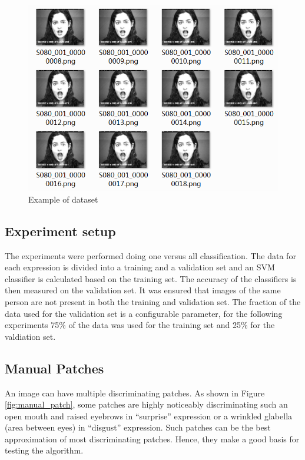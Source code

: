 \begin{figure}[h!]
\centering
\includegraphics[scale=0.55]{img/example.png}
\caption{Example of dataset}
\label{Example of dataset}
\end{figure}

\subsection{Experiment setup}
The experiments were performed doing one versus all classification. The data for each expression is divided into a training and a validation set and an SVM
classifier is calculated based on the training set. The accuracy of the classifiers is then measured on the validation set. It was ensured that images of the same
person are not present in both the training and validation set. The fraction of the data used for the validation set is a configurable parameter, for the 
following experiments 75\% of the data was used for the training set and 25\% for the valdiation set. 

\subsection{Manual Patches}

An image can have multiple discriminating patches. As shown in Figure \ref{fig:manual_patch}, some patches are highly noticeably discriminating such an open mouth and raised eyebrows in "`surprise"' expression or a wrinkled glabella (area between eyes) in "`disgust"' expression. Such patches can be the best approximation of most discriminating patches. Hence, they make a good basis for testing the algorithm. 


